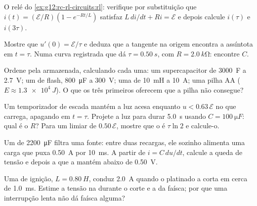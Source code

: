 \begin{exercise}[$\star\star$]\label{exo:g12:rc-rl-circuits:10}
O relé do \cref{ex:g12:rc-rl-circuits:rl}: verifique por substituição que
$i(t) = (\mathcal{E}/R)(1 - e^{-Rt/L})$ satisfaz $L\,di/dt + Ri = \mathcal{E}$ e depois
calcule $i(\tau)$ e $i(3\tau)$.
\end{exercise}

\begin{exercise}[$\star\star$]\label{exo:g12:rc-rl-circuits:11}
Mostre que $u'(0) = \mathcal{E}/\tau$ e deduza que a tangente na origem encontra a
assíntota em $t = \tau$. Numa curva registrada que dá $\tau = \qty{0.50}{s}$, com
$R = \qty{2.0}{k\ohm}$: encontre $C$.
\end{exercise}

\begin{exercise}[$\star\star\star$]\label{exo:g12:rc-rl-circuits:12}
Ordene pela  armazenada, calculando cada uma: um supercapacitor de \qty{3000}{F}
a \qty{2.7}{V}; um  de flash, \qty{800}{\micro F} a \qty{300}{V}; uma 
de \qty{10}{mH} a \qty{10}{A}; uma pilha AA ($E \approx \qty{1.3e4}{J}$). O que os três
primeiros oferecem que a pilha não consegue?
\end{exercise}

\begin{exercise}[$\star\star\star$]\label{exo:g12:rc-rl-circuits:13}
Um temporizador de escada mantém a luz acesa enquanto $u < 0.63\,\mathcal{E}$ no
 que carrega, apagando em $t = \tau$. Projete a luz para durar \qty{5.0}{s}
usando $C = \qty{100}{\micro F}$: qual é o $R$? Para um limiar de $0.50\,\mathcal{E}$,
mostre que o  é $\tau \ln 2$ e calcule-o.
\end{exercise}

\begin{exercise}[$\star\star\star$]\label{exo:g12:rc-rl-circuits:14}
Um  de \qty{2200}{\micro F} filtra uma fonte: entre duas recargas, ele sozinho
alimenta uma carga que puxa \qty{0.50}{A} por \qty{10}{ms}. A partir de
$i = C\,du/dt$, calcule a queda de tensão e depois a  que a mantém abaixo de
\qty{0.50}{V}.
\end{exercise}

\begin{exercise}[$\star\star\star$]\label{exo:g12:rc-rl-circuits:15}
Uma  de ignição, $L = \qty{0.80}{H}$, conduz \qty{2.0}{A} quando o platinado a
corta em cerca de \qty{1.0}{ms}. Estime a tensão na  durante o corte e a 
da faísca; por que uma interrupção lenta não dá faísca alguma?
\end{exercise}


